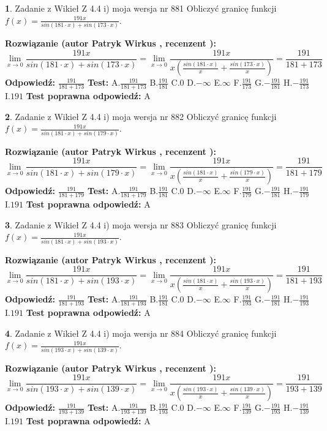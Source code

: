 \documentclass[12pt, a4paper]{article}
\theoremstyle{definition} %
\newtheorem{zad}{}
\newcommand{\zadStart}[1]{\begin{zad}#1\newline}
\newcommand{\zadStop}{\end{zad}}
\newcommand{\rozwStart}[2]{\noindent \textbf{Rozwiązanie (autor #1 , recenzent #2): }\newline}
\newcommand{\rozwStop}{\newline}
\newcommand{\odpStart}{\noindent \textbf{Odpowiedź:}\newline}
\newcommand{\odpStop}{\newline}
\newcommand{\testStart}{\noindent \textbf{Test:}\newline}
\newcommand{\testStop}{\newline}
\newcommand{\kluczStart}{\noindent \textbf{Test poprawna odpowiedź:}\newline}
\newcommand{\kluczStop}{\newline}
\begin{document}
\zadStart{Zadanie z Wikieł Z 4.4 i) moja wersja nr 881}
Obliczyć granicę funkcji $f(x)=\frac{191x}{sin(181\cdot x) +sin(173\cdot x)}$.
\zadStop
\rozwStart{Patryk Wirkus}{}
$$\lim\limits_{x\to 0}\frac{191x}{sin(181\cdot x) +sin(173\cdot x)}=\lim\limits_{x\to 0}\frac{191x}{x(\frac{sin(181\cdot x)}{x}+\frac{sin(173\cdot x)}{x})}=\frac{191}{181+173}$$
\rozwStop
\odpStart
$\frac{191}{181+173}$
\odpStop
\testStart
A.$\frac{191}{181+173}$
B.$\frac{191}{181}$
C.$0$
D.$-\infty$
E.$\infty$
F.$\frac{191}{173}$
G.$-\frac{191}{181}$
H.$-\frac{191}{173}$
I.$191$
\testStop
\kluczStart
A
\kluczStop



\zadStart{Zadanie z Wikieł Z 4.4 i) moja wersja nr 882}
Obliczyć granicę funkcji $f(x)=\frac{191x}{sin(181\cdot x) +sin(179\cdot x)}$.
\zadStop
\rozwStart{Patryk Wirkus}{}
$$\lim\limits_{x\to 0}\frac{191x}{sin(181\cdot x) +sin(179\cdot x)}=\lim\limits_{x\to 0}\frac{191x}{x(\frac{sin(181\cdot x)}{x}+\frac{sin(179\cdot x)}{x})}=\frac{191}{181+179}$$
\rozwStop
\odpStart
$\frac{191}{181+179}$
\odpStop
\testStart
A.$\frac{191}{181+179}$
B.$\frac{191}{181}$
C.$0$
D.$-\infty$
E.$\infty$
F.$\frac{191}{179}$
G.$-\frac{191}{181}$
H.$-\frac{191}{179}$
I.$191$
\testStop
\kluczStart
A
\kluczStop



\zadStart{Zadanie z Wikieł Z 4.4 i) moja wersja nr 883}
Obliczyć granicę funkcji $f(x)=\frac{191x}{sin(181\cdot x) +sin(193\cdot x)}$.
\zadStop
\rozwStart{Patryk Wirkus}{}
$$\lim\limits_{x\to 0}\frac{191x}{sin(181\cdot x) +sin(193\cdot x)}=\lim\limits_{x\to 0}\frac{191x}{x(\frac{sin(181\cdot x)}{x}+\frac{sin(193\cdot x)}{x})}=\frac{191}{181+193}$$
\rozwStop
\odpStart
$\frac{191}{181+193}$
\odpStop
\testStart
A.$\frac{191}{181+193}$
B.$\frac{191}{181}$
C.$0$
D.$-\infty$
E.$\infty$
F.$\frac{191}{193}$
G.$-\frac{191}{181}$
H.$-\frac{191}{193}$
I.$191$
\testStop
\kluczStart
A
\kluczStop



\zadStart{Zadanie z Wikieł Z 4.4 i) moja wersja nr 884}
Obliczyć granicę funkcji $f(x)=\frac{191x}{sin(193\cdot x) +sin(139\cdot x)}$.
\zadStop
\rozwStart{Patryk Wirkus}{}
$$\lim\limits_{x\to 0}\frac{191x}{sin(193\cdot x) +sin(139\cdot x)}=\lim\limits_{x\to 0}\frac{191x}{x(\frac{sin(193\cdot x)}{x}+\frac{sin(139\cdot x)}{x})}=\frac{191}{193+139}$$
\rozwStop
\odpStart
$\frac{191}{193+139}$
\odpStop
\testStart
A.$\frac{191}{193+139}$
B.$\frac{191}{193}$
C.$0$
D.$-\infty$
E.$\infty$
F.$\frac{191}{139}$
G.$-\frac{191}{193}$
H.$-\frac{191}{139}$
I.$191$
\testStop
\kluczStart
A
\kluczStop
\end{document}
